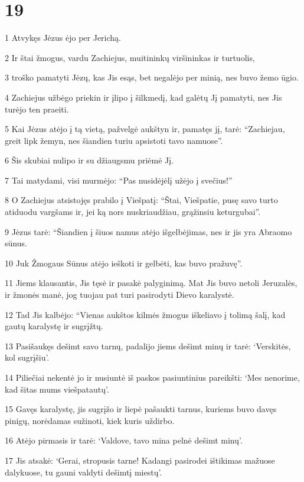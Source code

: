 \chapter{19}


\par 1 Atvykęs Jėzus ėjo per Jerichą. 
\par 2 Ir štai žmogus, vardu Zachiejus, muitininkų viršininkas ir turtuolis, 
\par 3 troško pamatyti Jėzų, kas Jis esąs, bet negalėjo per minią, nes buvo žemo ūgio. 
\par 4 Zachiejus užbėgo priekin ir įlipo į šilkmedį, kad galėtų Jį pamatyti, nes Jis turėjo ten praeiti. 
\par 5 Kai Jėzus atėjo į tą vietą, pažvelgė aukštyn ir, pamatęs jį, tarė: “Zachiejau, greit lipk žemyn, nes šiandien turiu apsistoti tavo namuose”. 
\par 6 Šis skubiai nulipo ir su džiaugsmu priėmė Jį. 
\par 7 Tai matydami, visi murmėjo: “Pas nusidėjėlį užėjo į svečius!” 
\par 8 O Zachiejus atsistojęs prabilo į Viešpatį: “Štai, Viešpatie, pusę savo turto atiduodu vargšams ir, jei ką nors nuskriaudžiau, grąžinsiu keturgubai”. 
\par 9 Jėzus tarė: “Šiandien į šiuos namus atėjo išgelbėjimas, nes ir jis yra Abraomo sūnus. 
\par 10 Juk Žmogaus Sūnus atėjo ieškoti ir gelbėti, kas buvo pražuvę”. 
\par 11 Jiems klausantis, Jis tęsė ir pasakė palyginimą. Mat Jis buvo netoli Jeruzalės, ir žmonės manė, jog tuojau pat turi pasirodyti Dievo karalystė. 
\par 12 Tad Jis kalbėjo: “Vienas aukštos kilmės žmogus iškeliavo į tolimą šalį, kad gautų karalystę ir sugrįžtų. 
\par 13 Pasišaukęs dešimt savo tarnų, padalijo jiems dešimt minų ir tarė: ‘Verskitės, kol sugrįšiu’. 
\par 14 Piliečiai nekentė jo ir nusiuntė iš paskos pasiuntinius pareikšti: ‘Mes nenorime, kad šitas mums viešpatautų’. 
\par 15 Gavęs karalystę, jis sugrįžo ir liepė pašaukti tarnus, kuriems buvo davęs pinigų, norėdamas sužinoti, kiek kuris uždirbo. 
\par 16 Atėjo pirmasis ir tarė: ‘Valdove, tavo mina pelnė dešimt minų’. 
\par 17 Jis atsakė: ‘Gerai, stropusis tarne! Kadangi pasirodei ištikimas mažuose dalykuose, tu gauni valdyti dešimtį miestų’. 
